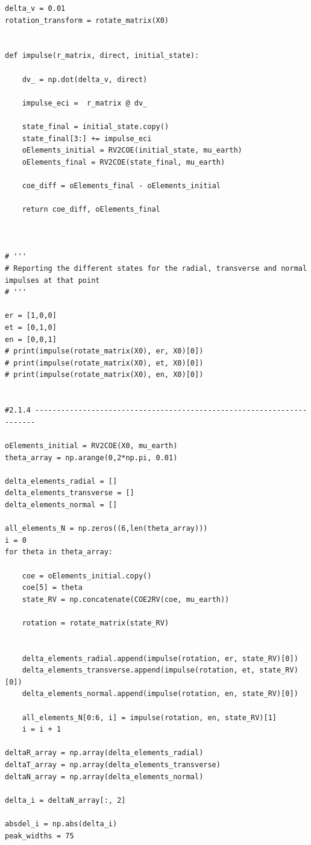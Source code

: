 \documentclass[a4paper, 12pt]{article}  %
\begin{document}
\begin{lstlisting}
delta_v = 0.01
rotation_transform = rotate_matrix(X0)


def impulse(r_matrix, direct, initial_state):
    
    dv_ = np.dot(delta_v, direct)
    
    impulse_eci =  r_matrix @ dv_
    
    state_final = initial_state.copy()
    state_final[3:] += impulse_eci
    oElements_initial = RV2COE(initial_state, mu_earth)
    oElements_final = RV2COE(state_final, mu_earth)
    
    coe_diff = oElements_final - oElements_initial
    
    return coe_diff, oElements_final
    
    

# '''
# Reporting the different states for the radial, transverse and normal impulses at that point
# '''

er = [1,0,0]
et = [0,1,0]
en = [0,0,1]
# print(impulse(rotate_matrix(X0), er, X0)[0])
# print(impulse(rotate_matrix(X0), et, X0)[0])
# print(impulse(rotate_matrix(X0), en, X0)[0])


#2.1.4 ----------------------------------------------------------------------

oElements_initial = RV2COE(X0, mu_earth)
theta_array = np.arange(0,2*np.pi, 0.01)

delta_elements_radial = []
delta_elements_transverse = []
delta_elements_normal = []

all_elements_N = np.zeros((6,len(theta_array)))
i = 0
for theta in theta_array:
    
    coe = oElements_initial.copy()
    coe[5] = theta
    state_RV = np.concatenate(COE2RV(coe, mu_earth))
    
    rotation = rotate_matrix(state_RV)
    
    
    delta_elements_radial.append(impulse(rotation, er, state_RV)[0])
    delta_elements_transverse.append(impulse(rotation, et, state_RV)[0])
    delta_elements_normal.append(impulse(rotation, en, state_RV)[0])
    
    all_elements_N[0:6, i] = impulse(rotation, en, state_RV)[1]
    i = i + 1

deltaR_array = np.array(delta_elements_radial)
deltaT_array = np.array(delta_elements_transverse)
deltaN_array = np.array(delta_elements_normal)

delta_i = deltaN_array[:, 2]

absdel_i = np.abs(delta_i)
peak_widths = 75


\end{lstlisting}
\end{document}

